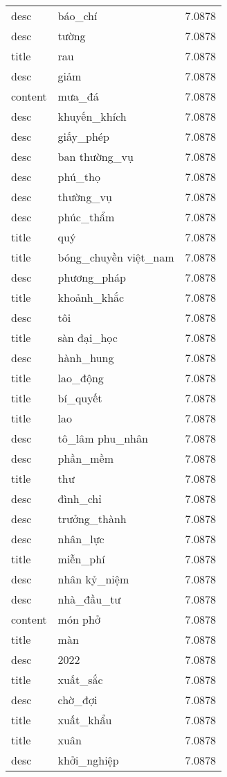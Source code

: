 \documentclass{article}
\begin{document}
\begin{tabular}{lll}
desc & báo\_chí & 7.0878\\
desc & tường & 7.0878\\
title & rau & 7.0878\\
desc & giảm & 7.0878\\
content & mưa\_đá & 7.0878\\
desc & khuyến\_khích & 7.0878\\
desc & giấy\_phép & 7.0878\\
desc & ban thường\_vụ & 7.0878\\
desc & phú\_thọ & 7.0878\\
desc & thường\_vụ & 7.0878\\
desc & phúc\_thẩm & 7.0878\\
title & quý & 7.0878\\
title & bóng\_chuyền việt\_nam & 7.0878\\
desc & phương\_pháp & 7.0878\\
title & khoảnh\_khắc & 7.0878\\
desc & tôi & 7.0878\\
title & sàn đại\_học & 7.0878\\
desc & hành\_hung & 7.0878\\
title & lao\_động & 7.0878\\
title & bí\_quyết & 7.0878\\
title & lao & 7.0878\\
desc & tô\_lâm phu\_nhân & 7.0878\\
desc & phần\_mềm & 7.0878\\
title & thư & 7.0878\\
desc & đình\_chỉ & 7.0878\\
desc & trưởng\_thành & 7.0878\\
desc & nhân\_lực & 7.0878\\
title & miễn\_phí & 7.0878\\
desc & nhân kỷ\_niệm & 7.0878\\
desc & nhà\_đầu\_tư & 7.0878\\
content & món phở & 7.0878\\
title & màn & 7.0878\\
desc & 2022 & 7.0878\\
title & xuất\_sắc & 7.0878\\
desc & chờ\_đợi & 7.0878\\
title & xuất\_khẩu & 7.0878\\
title & xuân & 7.0878\\
desc & khởi\_nghiệp & 7.0878\\

\end{tabular}
\end{document}
